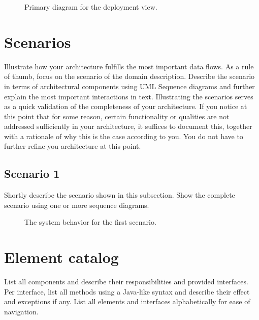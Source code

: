 \documentclass[a4paper,10pt]{article}
\begin{document}
\begin{figure}[!htp]
    \centering
    \caption{Primary diagram for the deployment view.}\label{fig:depl_primary}
\end{figure}

\section{Scenarios}\label{sec:scenarios}
Illustrate how your architecture fulfills the most important data flows.
As a rule of thumb, focus on the scenario of the domain description.
Describe the scenario in terms of architectural components using UML Sequence
diagrams and further explain the most important interactions in text.
Illustrating the scenarios serves as a quick validation of the completeness of
your architecture.
If you notice at this point that for some reason, certain functionality or
qualities are not addressed sufficiently in your architecture, it suffices to
document this, together with a rationale of why this is the case according to
you.
You do not have to further refine you architecture at this point.

\subsection{Scenario 1}
Shortly describe the scenario shown in this subsection.
Show the complete scenario using one or more sequence diagrams.

\begin{figure}[!htp]
    \centering
    \caption{The system behavior for the first scenario.
        }\label{fig:seq_scenario1}
\end{figure}

\appendix
\section{Element catalog}\label{app:catalog}
List all components and describe their responsibilities and provided
interfaces.
Per interface, list all methods using a Java-like syntax and describe their
effect and exceptions if any.
List all elements and interfaces alphabetically for ease of navigation.
\end{document}

